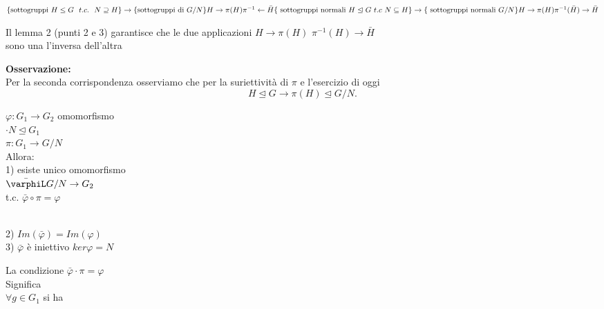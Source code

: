 \documentclass[12px]{article}
\begin{document}
{\begin{teo}
\begin{center}
			 $\lbrace \text{sottogruppi } H\leq G \ \ t.c. \ \ N\supseteq H\rbrace \rightarrow \{\text{sottogruppi di } G/N\rbrace\\
			 H \rightarrow \pi (H)\\
			 \pi^{-1} \leftarrow \bar H\\
			 \lbrace \text{ sottogruppi normali } H\trianglelefteq G \ t.c \ N\subseteq H\rbrace \rightarrow \lbrace \text{ sottogruppi normali } G/N \rbrace\\
			 H \rightarrow \pi(H)\\
			 \pi^{-1}(\bar H) \rightarrow \bar H$
		 \end{center}
	  \end{teo}
	  \begin{dimo}
		  Il lemma 2 (punti 2 e 3) garantisce che le due applicazioni $H \rightarrow \pi(H)$ $\pi^{-1}(H) \rightarrow\bar H$\\
		  sono una l'inversa dell'altra
	  \end{dimo}
	  \textbf{Osservazione:}\\
	  Per la seconda corrispondenza osserviamo che per la suriettività di $\pi$ e l'esercizio di oggi \\
	  \[
	  H\trianglelefteq G \rightarrow \pi (H)\trianglelefteq G/N
	  .\] 
	  \begin{teo}
	  	$ \varphi:G_1 \rightarrow G_2$ omomorfismo\\
		$\cdot N\trianglelefteq G_1$\\
		$\pi:G_1 \rightarrow G/N$\\
		Allora:\\
		1) esiste unico omomorfismo\\
		$\bar\varphiL G/N \rightarrow G_2$\\
		t.c. $ \bar  \varphi\circ \pi = \varphi$
		 \\
2) $Im (\bar \varphi) = Im ( \varphi)$\\
3) $ \bar \varphi$ è iniettivo \Leftrightarrow $ker\varphi = N$
	  \end{teo}
	  \begin{dimo}
	  	La condizione $\bar \varphi \cdot \pi = \varphi$\\
		Significa\\
		$\forall g\in G_1$ si ha \\

\end{dimo}}
\end{document}
